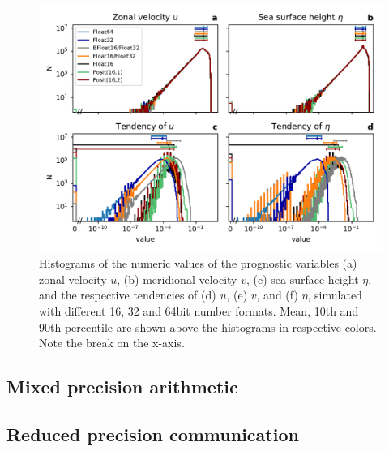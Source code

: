 \documentclass[draft]{agujournal2019}
\begin{document}

\begin{figure}
\includegraphics[width=1\textwidth]{../plots/tendency_hist.pdf}
\caption{Histograms of the numeric values of the prognostic variables (a) zonal velocity $u$, (b) meridional velocity $v$, (c) sea surface height $\eta$, and the respective tendencies of (d) $u$, (e) $v$, and (f) $\eta$, simulated with different 16, 32 and 64bit number formats. Mean, 10th and 90th percentile are shown above the histograms in respective colors. Note the break on the x-axis.}
\label{fig:tend}
\end{figure}



\subsection{Mixed precision arithmetic}
\label{sec:mixed}


\subsection{Reduced precision communication}
\label{sec:comm}
\end{document}

